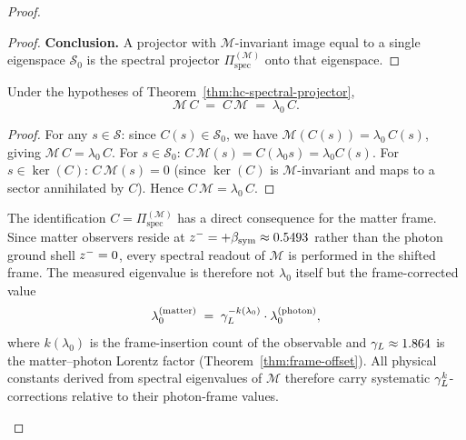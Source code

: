 \begin{proof}
\begin{proof}
\smallskip
\noindent\textbf{Conclusion.}
A projector with $\mathcal{M}$-invariant image equal to a single eigenspace
$\mathcal{S}_0$ is the spectral projector $\Pi^{(\mathcal{M})}_{\mathrm{spec}}$
onto that eigenspace.
\end{proof}

\begin{corollary}
\label{cor:M-HC-fixpoint}
Under the hypotheses of Theorem~\ref{thm:hc-spectral-projector},
\[
  \mathcal{M}\,C \;=\; C\,\mathcal{M} \;=\; \lambda_0\,C.
\]
\end{corollary}

\begin{proof}
For any $s\in\mathcal{S}$: since $C(s)\in\mathcal{S}_0$, we have
$\mathcal{M}(C(s))=\lambda_0\,C(s)$, giving $\mathcal{M}\,C=\lambda_0\,C$.
For $s\in\mathcal{S}_0$: $C\,\mathcal{M}(s)=C(\lambda_0 s)=\lambda_0 C(s)$.
For $s\in\ker(C)$: $C\,\mathcal{M}(s)=0$ (since $\ker(C)$ is
$\mathcal{M}$-invariant and maps to a sector annihilated by $C$).
Hence $C\,\mathcal{M}=\lambda_0\,C$.
\end{proof}

\begin{remark}
\label{rem:frame-shift-spectral}
The identification $C = \Pi^{(\mathcal{M})}_{\mathrm{spec}}$ has a direct
consequence for the matter frame. Since matter observers reside at
$z^- = +\beta_{\mathrm{sym}} \approx 0.5493$ rather than the photon ground shell
$z^- = 0$, every spectral readout of $\mathcal{M}$ is performed in the
shifted frame. The measured eigenvalue is therefore not $\lambda_0$ itself
but the frame-corrected value
\[
  \lambda_0^{(\mathrm{matter})}
  \;=\; \gamma_L^{-k(\lambda_0)}\cdot\lambda_0^{(\mathrm{photon})},
\]
where $k(\lambda_0)$ is the frame-insertion count of the observable and
$\gamma_L \approx 1.864$ is the matter--photon Lorentz factor
(Theorem~\ref{thm:frame-offset}). All physical constants derived from
spectral eigenvalues of $\mathcal{M}$ therefore carry systematic
$\gamma_L^k$-corrections relative to their photon-frame values.
\end{remark}


\end{proof}
